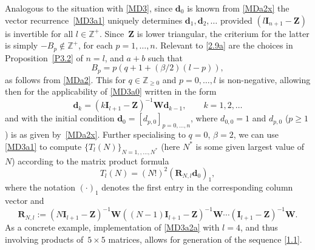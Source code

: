 \documentclass[pdftex]{sigma}
\numberwithin{equation}{section}
\theoremstyle{definition}
\begin{document}
Analogous to the situation with \eqref{MD3},
since ${\mathbf d}_0$ is known from \eqref{MDa2x} the vector recurrence~\eqref{MD3a1} uniquely determines
 ${\mathbf d}_1,{\mathbf d}_2,\dots$ provided $(l {\mathbf I}_{n+1} -\mathbf Z)$ is invertible for all $l \in \mathbb Z^+$. Since~$\mathbf Z$ is lower triangular, the criterium for the latter is simply $- B_p \notin \mathbb Z^+$,
for each $p=1,\dots,n$. Relevant to \eqref{2.9a} are the choices in Proposition~\ref{P3.2} of
$n=l$, and $a+b$ such that
\begin{equation}\label{MD3a3}
B_p = p ( q + 1+ (\beta/2) (l - p ) ),
\end{equation}
as follows from \eqref{MDa2}.
This for $q \in \mathbb Z_{\ge 0}$ and $p=0,\dots,l$ is non-negative, allowing then for the applicability of \eqref{MD3a0} written in the form
\begin{equation}\label{MD3a1}
 \mathbf d_k = (k {\mathbf I}_{l+1} -\mathbf Z)^{-1}\mathbf W \mathbf d_{k-1},\qquad k=1,2,\dots
 \end{equation}
and with the initial condition $\mathbf d_0 = [d_{p,0}]_{p=0,\dots,n}$, where $d_{0,0}=1$ and $d_{p,0}$ ($p \ge 1$) is as given by~\eqref{MDa2x}. Further specialising to $q=0$, $\beta = 2$, we can use \eqref{MD3a1} to compute $\{T_l(N) \}_{N=1,,\dots,N^*}$ (here $N^*$ is some given largest value of $N$) according to the matrix product formula
\begin{equation}\label{MD3a2a}
T_l(N) = (N!)^2
( \mathbf R_{N,l} \mathbf d_0)_{1},
\end{equation}
where the notation $( \cdot )_{1}$ denotes the first entry in the corresponding column vector and
\[
\mathbf R_{N,l} :=
(N {\mathbf I}_{l+1} -\mathbf Z)^{-1}
{\mathbf W}
((N-1) {\mathbf I}_{l+1} -\mathbf Z)^{-1}
{\mathbf W}
\cdots
( {\mathbf I}_{l+1} -\mathbf Z)^{-1}
{\mathbf W}.
\]
 As a concrete example, implementation of \eqref{MD3a2a} with $l=4$,
and thus involving products of~${5 \times 5}$ matrices, allows for generation of the sequence \eqref{1.1}.
\end{document}
